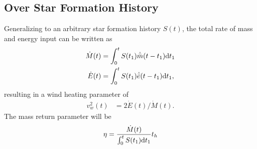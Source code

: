 \subsection{Over Star Formation History}
Generalizing to an arbitrary star formation history $S(t)$, the total rate of mass and energy input can be written as
\begin{align} 
  \dot{M}(t) &= \int_0^t S(t_1) \dot{\bar{m}}(t-t_1){\rm
      d}t_1 \label{eq:MDotSFH}\\
  \dot{E}(t) &= \int_0^t S(t_1) \dot{\bar{e}}(t-t_1){\rm
      d}t_1, \label{eq:EDotSFH}
\end{align}
resulting in a wind heating parameter of 
\begin{align}
  v_w^2(t) &=2 \dot{E}(t)/\dot{M}(t).
\end{align}
The mass return parameter will be
\begin{align}
\eta = \frac{\dot{M}(t)}{\int_0^t S(t_1) {\rm d}t_1} t_h
\end{align}

